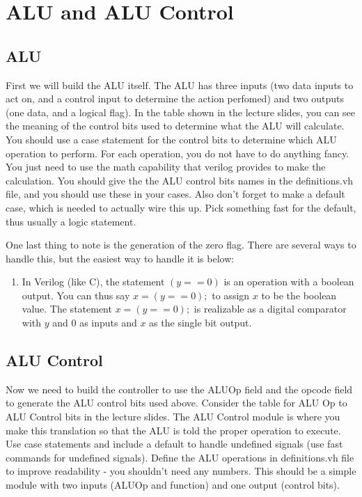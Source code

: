 \chapter{ALU and ALU Control}

\section{ALU}

First we will build the ALU itself.  The ALU has three inputs (two data inputs to act on, and a control input to determine the action perfomed) and two outputs (one data, and a logical flag). In the table shown in the lecture slides, you can see the meaning of the control bits used to determine what the ALU will calculate.  You should use a case statement for the control bits to determine which ALU operation to perform.  For each operation, you do not have to do anything fancy.  You just need to use the math capability that verilog provides to make the calculation.  You should give the the ALU control bits names in the definitions.vh file, and you should use these in your cases.  Also don't forget to make a default case, which is needed to actually wire this up.  Pick something fast for the default, thus usually a logic statement.

One last thing to note is the generation of the zero flag.  There are several ways to handle this, but the easiest way to handle it is below: 
\begin{enumerate}
\item In Verilog (like C), the statement $(y==0)$ is an operation with a boolean output.  You can thus say $x=(y==0);$ to assign $x$ to be the boolean value.  The statement $x=(y==0);$ is realizable as a digital comparator with $y$ and $0$ as inputs and $x$ as the single bit output.
\end{enumerate}

\section{ALU Control}

Now we need to build the controller to use the ALUOp field and the opcode field to generate the ALU control bits used above.  Consider the table for ALU Op to ALU Control bits in the lecture slides.  The ALU Control module is where you make this translation so that the ALU is told the proper operation to execute.  Use case statements and include a default to handle undefined signals (use fast commands for undefined signals).  Define the ALU operations in definitions.vh file to improve readability - you shouldn't need any numbers.  This should be a simple module with two inputs (ALUOp and function) and one output (control bits).

